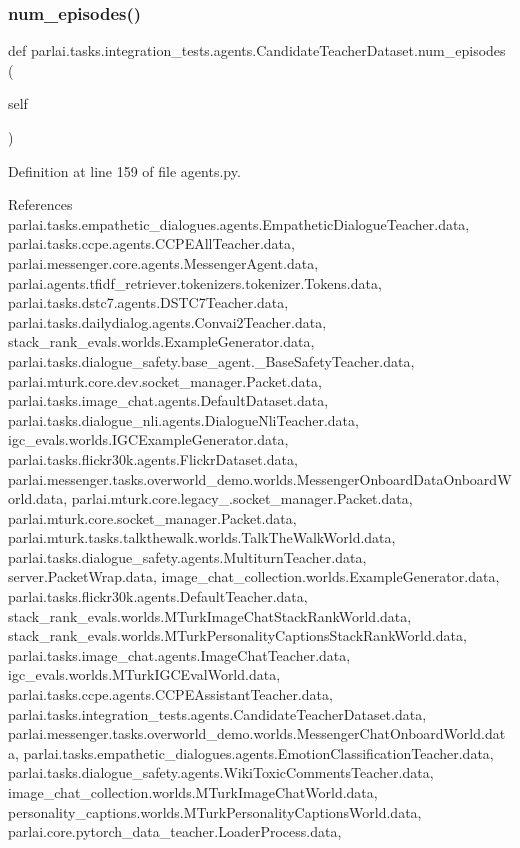 \subsubsection{\texorpdfstring{num\+\_\+episodes()}{num\_episodes()}}
{\footnotesize\ttfamily def parlai.\+tasks.\+integration\+\_\+tests.\+agents.\+Candidate\+Teacher\+Dataset.\+num\+\_\+episodes (\begin{DoxyParamCaption}\item[{}]{self }\end{DoxyParamCaption})}



Definition at line 159 of file agents.\+py.



References parlai.\+tasks.\+empathetic\+\_\+dialogues.\+agents.\+Empathetic\+Dialogue\+Teacher.\+data, parlai.\+tasks.\+ccpe.\+agents.\+C\+C\+P\+E\+All\+Teacher.\+data, parlai.\+messenger.\+core.\+agents.\+Messenger\+Agent.\+data, parlai.\+agents.\+tfidf\+\_\+retriever.\+tokenizers.\+tokenizer.\+Tokens.\+data, parlai.\+tasks.\+dstc7.\+agents.\+D\+S\+T\+C7\+Teacher.\+data, parlai.\+tasks.\+dailydialog.\+agents.\+Convai2\+Teacher.\+data, stack\+\_\+rank\+\_\+evals.\+worlds.\+Example\+Generator.\+data, parlai.\+tasks.\+dialogue\+\_\+safety.\+base\+\_\+agent.\+\_\+\+Base\+Safety\+Teacher.\+data, parlai.\+mturk.\+core.\+dev.\+socket\+\_\+manager.\+Packet.\+data, parlai.\+tasks.\+image\+\_\+chat.\+agents.\+Default\+Dataset.\+data, parlai.\+tasks.\+dialogue\+\_\+nli.\+agents.\+Dialogue\+Nli\+Teacher.\+data, igc\+\_\+evals.\+worlds.\+I\+G\+C\+Example\+Generator.\+data, parlai.\+tasks.\+flickr30k.\+agents.\+Flickr\+Dataset.\+data, parlai.\+messenger.\+tasks.\+overworld\+\_\+demo.\+worlds.\+Messenger\+Onboard\+Data\+Onboard\+World.\+data, parlai.\+mturk.\+core.\+legacy\+\_.\+socket\+\_\+manager.\+Packet.\+data, parlai.\+mturk.\+core.\+socket\+\_\+manager.\+Packet.\+data, parlai.\+mturk.\+tasks.\+talkthewalk.\+worlds.\+Talk\+The\+Walk\+World.\+data, parlai.\+tasks.\+dialogue\+\_\+safety.\+agents.\+Multiturn\+Teacher.\+data, server.\+Packet\+Wrap.\+data, image\+\_\+chat\+\_\+collection.\+worlds.\+Example\+Generator.\+data, parlai.\+tasks.\+flickr30k.\+agents.\+Default\+Teacher.\+data, stack\+\_\+rank\+\_\+evals.\+worlds.\+M\+Turk\+Image\+Chat\+Stack\+Rank\+World.\+data, stack\+\_\+rank\+\_\+evals.\+worlds.\+M\+Turk\+Personality\+Captions\+Stack\+Rank\+World.\+data, parlai.\+tasks.\+image\+\_\+chat.\+agents.\+Image\+Chat\+Teacher.\+data, igc\+\_\+evals.\+worlds.\+M\+Turk\+I\+G\+C\+Eval\+World.\+data, parlai.\+tasks.\+ccpe.\+agents.\+C\+C\+P\+E\+Assistant\+Teacher.\+data, parlai.\+tasks.\+integration\+\_\+tests.\+agents.\+Candidate\+Teacher\+Dataset.\+data, parlai.\+messenger.\+tasks.\+overworld\+\_\+demo.\+worlds.\+Messenger\+Chat\+Onboard\+World.\+data, parlai.\+tasks.\+empathetic\+\_\+dialogues.\+agents.\+Emotion\+Classification\+Teacher.\+data, parlai.\+tasks.\+dialogue\+\_\+safety.\+agents.\+Wiki\+Toxic\+Comments\+Teacher.\+data, image\+\_\+chat\+\_\+collection.\+worlds.\+M\+Turk\+Image\+Chat\+World.\+data, personality\+\_\+captions.\+worlds.\+M\+Turk\+Personality\+Captions\+World.\+data, parlai.\+core.\+pytorch\+\_\+data\+\_\+teacher.\+Loader\+Process.\+data, 